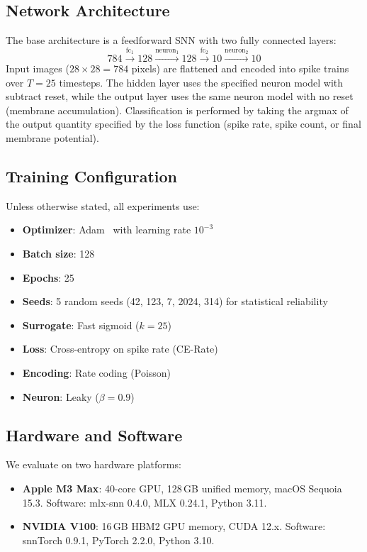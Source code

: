 \documentclass[11pt]{article}
\begin{document}
\subsection{Network Architecture}

The base architecture is a feedforward SNN with two fully connected layers:
\begin{equation}
    784 \xrightarrow{\text{fc}_1} 128 \xrightarrow{\text{neuron}_1} 128 \xrightarrow{\text{fc}_2} 10 \xrightarrow{\text{neuron}_2} 10
    \label{eq:arch}
\end{equation}
Input images ($28 \times 28 = 784$ pixels) are flattened and encoded into spike trains over $T=25$ timesteps. The hidden layer uses the specified neuron model with subtract reset, while the output layer uses the same neuron model with no reset (membrane accumulation). Classification is performed by taking the argmax of the output quantity specified by the loss function (spike rate, spike count, or final membrane potential).

\subsection{Training Configuration}

Unless otherwise stated, all experiments use:
\begin{itemize}[nosep]
    \item \textbf{Optimizer}: Adam~\citep{kingma2015adam} with learning rate $10^{-3}$
    \item \textbf{Batch size}: 128
    \item \textbf{Epochs}: 25
    \item \textbf{Seeds}: 5 random seeds (42, 123, 7, 2024, 314) for statistical reliability
    \item \textbf{Surrogate}: Fast sigmoid ($k=25$)
    \item \textbf{Loss}: Cross-entropy on spike rate (CE-Rate)
    \item \textbf{Encoding}: Rate coding (Poisson)
    \item \textbf{Neuron}: Leaky ($\beta=0.9$)
\end{itemize}

\subsection{Hardware and Software}

We evaluate on two hardware platforms:
\begin{itemize}[nosep]
    \item \textbf{Apple M3 Max}: 40-core GPU, 128\,GB unified memory, macOS Sequoia 15.3. Software: mlx-snn 0.4.0, MLX 0.24.1, Python 3.11.
    \item \textbf{NVIDIA V100}: 16\,GB HBM2 GPU memory, CUDA 12.x. Software: snnTorch 0.9.1, PyTorch 2.2.0, Python 3.10.
\end{itemize}
\end{document}
